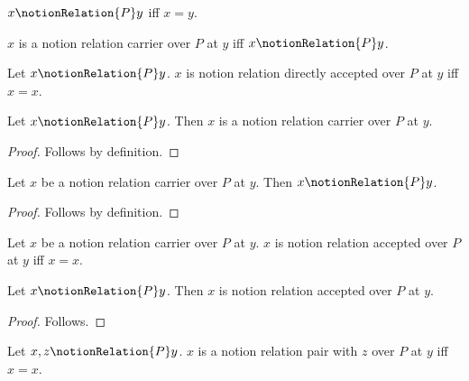 \begin{definition}\label{notion_relation}
    $x\notionRelation{P}y$ iff $x=y$.
\end{definition}

\begin{definition}\label{notion_relation_carrier}
    $x$ is a notion relation carrier over $P$ at $y$ iff
    $x\notionRelation{P}y$.
\end{definition}

\begin{definition}\label{notion_relation_direct_accepted}
    Let $x\notionRelation{P}y$.
    $x$ is notion relation directly accepted over $P$ at $y$ iff $x=x$.
\end{definition}

\begin{classification}\label{notion_relation_to_carrier}
    Let $x\notionRelation{P}y$.
    Then $x$ is a notion relation carrier over $P$ at $y$.
\end{classification}
\begin{proof}
    Follows by definition.
\end{proof}

\begin{classification}\label{notion_carrier_to_relation}
    Let $x$ be a notion relation carrier over $P$ at $y$.
    Then $x\notionRelation{P}y$.
\end{classification}
\begin{proof}
    Follows by definition.
\end{proof}

\begin{definition}\label{notion_relation_accepted}
    Let $x$ be a notion relation carrier over $P$ at $y$.
    $x$ is notion relation accepted over $P$ at $y$ iff $x=x$.
\end{definition}

\begin{proposition}\label{notion_relation_view_use}
    Let $x\notionRelation{P}y$.
    Then $x$ is notion relation accepted over $P$ at $y$.
\end{proposition}
\begin{proof}
    Follows.
\end{proof}

\begin{definition}\label{notion_relation_pair}
    Let $x,z\notionRelation{P}y$.
    $x$ is a notion relation pair with $z$ over $P$ at $y$ iff $x=x$.
\end{definition}

